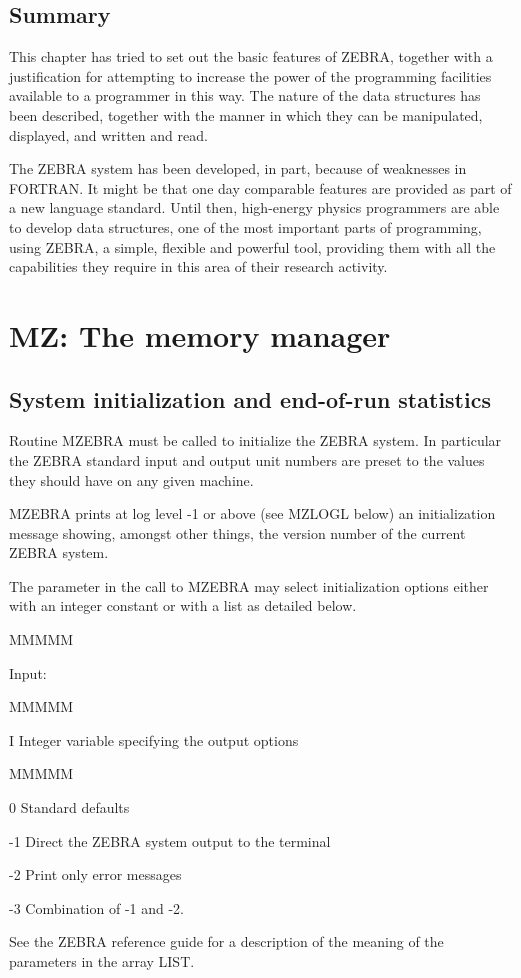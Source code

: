 \section{Summary}
\par
This chapter has tried to set out the basic features of ZEBRA, together
with a justification for attempting to increase the power of the
programming facilities available to a programmer in this way. The nature
of the data structures has been described, together with the manner
in which they
can be manipulated, displayed, and written and read.
\par
The ZEBRA system has been developed, in part, because of weaknesses in
FORTRAN. It might be that one day comparable
features are provided as part
of a new language standard.
Until then, high-energy physics programmers are able
to develop data structures, one of the most important parts of
programming, using ZEBRA,
a simple, flexible and powerful tool,
providing them with all
the capabilities they require in this area of their research activity.
\chapter{MZ: The memory manager}
\section{System initialization and end-of-run statistics}
\par Routine MZEBRA must be called to initialize the ZEBRA system.
In particular the ZEBRA standard input and output unit numbers are
preset to the values they should have on any given machine.
\par MZEBRA prints at log level -1 or above (see MZLOGL below)
an initialization message
showing, amongst other things, the version number of the
current ZEBRA system.
\par The parameter in the call to MZEBRA may select initialization
options either with an integer constant or with a list as detailed below.
\par
\begin{DL}{MMMMM}
\item[Input:
]
\begin{DL}{MMMMM}
\item[I
]Integer variable specifying the output options
\begin{DL}{MMMMM}
\item[ 0
]Standard defaults
\item[-1
]Direct the ZEBRA system output to the terminal
\item[-2
]Print only error messages
\item[-3
]Combination of -1 and -2.
\end{DL}
\end{DL}
\end{DL}
See the ZEBRA reference guide for a description of the meaning
of the parameters in the array LIST.

